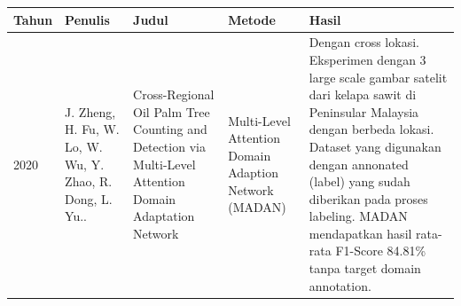 \begin{singlespace}
	\begin{table}[H]
		\centering
		\begin{tabular}{|p{2cm}|p{2cm}|p{2cm}|p{2cm}|p{2cm}|}	
			\hline
			Tahun & Penulis & Judul & Metode & Hasil \\ \hline
			2020  & J. Zheng, H. Fu, W. Lo, W. Wu, Y. Zhao, R.   Dong, L. Yu..             & Cross-Regional Oil Palm Tree Counting and Detection via Multi-Level Attention Domain Adaptation Network                                              & Multi-Level Attention Domain Adaption Network (MADAN)                                                                                                                           & Dengan cross lokasi. Eksperimen dengan 3 large scale gambar satelit dari kelapa sawit di Peninsular Malaysia dengan berbeda lokasi. Dataset yang digunakan dengan annonated (label) yang sudah diberikan pada proses labeling. MADAN mendapatkan hasil rata-rata F1-Score 84.81\% tanpa target domain annotation. \\ \hline
		\end{tabular}
	\end{table}
\end{singlespace}

